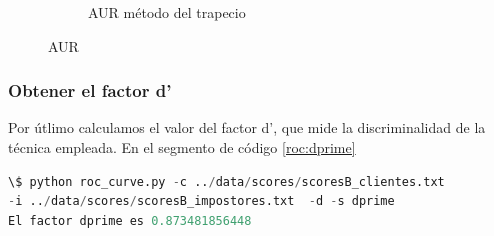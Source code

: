 \begin{figure}[ht]
\begin{subfigure}[b]{0.5\textwidth}
                \caption{AUR método del trapecio}
                \label{fig:aurTrap}
        \end{subfigure}
    \caption{AUR}\label{fig:aur}
\end{figure}


\subsubsection{Obtener el factor d'}
Por útlimo calculamos el valor del factor d', que mide la discriminalidad de la técnica empleada. En el segmento de código \ref{roc:dprime} 

\begin{lstlisting}[language=python,label=roc:dprime,caption=Calculo del factor d-prime]
\$ python roc_curve.py -c ../data/scores/scoresB_clientes.txt 
-i ../data/scores/scoresB_impostores.txt  -d -s dprime
El factor dprime es 0.873481856448
\end{lstlisting}

